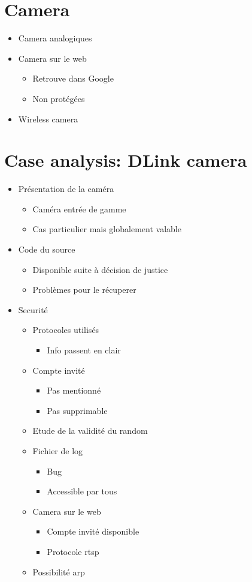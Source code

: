 
\chapter{Camera}

\begin{itemize}
\item Camera analogiques
\item Camera sur le web
  \begin{itemize}
  \item Retrouve dans Google
  \item Non protégées
  \end{itemize}
\item Wireless camera
\end{itemize}

\chapter{Case analysis: DLink camera}

\begin{itemize}
\item Présentation de la caméra
  \begin{itemize}
  \item Caméra entrée de gamme
  \item Cas particulier mais globalement valable
  \end{itemize}
\item Code du source
  \begin{itemize}
  \item Disponible suite à décision de justice
  \item Problèmes pour le récuperer
  \end{itemize}
\item Securité
  \begin{itemize}
  \item Protocoles utilisés
    \begin{itemize}
    \item Info passent en clair
    \end{itemize}
  \item Compte invité
    \begin{itemize}
    \item Pas mentionné
    \item Pas supprimable
    \end{itemize}
  \item Etude de la validité du random
  \item Fichier de log
    \begin{itemize}
    \item Bug
    \item Accessible par tous
    \end{itemize}
  \item Camera sur le web
    \begin{itemize}
    \item Compte invité disponible
    \item Protocole rtsp
    \end{itemize}
  \item Possibilité arp
  \end{itemize}
\end{itemize}